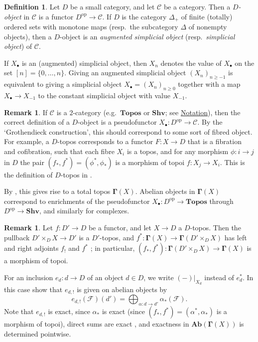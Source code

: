 \documentclass[11pt]{amsart}
\theoremstyle{definition}
\newtheorem{Rmk}[Thm]{Remark}
\newtheorem{Def}[Thm]{Definition}
\newcommand{\op}{^{\operatorname{op}}}
\newcommand{\Ab}{\mathbf{Ab}}
\newcommand{\Topos}{\mathbf{Topos}}
\newcommand{\SHV}{\mathbf{Shv}}
\begin{document}
\begin{Def}
Let $D$ be a small category, and let $\mathscr C$ be a category.
Then a \emph{$D$-object} in $\mathscr C$ is a functor $D\op \to
\mathscr C$. If $D$ is the category $\Delta_+$ of finite (totally)
ordered sets with monotone maps (resp.\ the subcategory $\Delta$ of
nonempty objects), then a $D$-object is an \emph{augmented
simplicial object} (resp.\ \emph{simplicial object}) of $\mathscr
C$.

If $X_\bullet$ is an (augmented) simplicial object, then $X_n$
denotes the value of $X_\bullet$ on the set $[n] = \{0,\ldots,n\}$.
Giving an augmented simplicial object $(X_n)_{n \geq -1}$ is
equivalent to giving a simplicial object $X_\bullet = (X_n)_{n \geq
0}$ together with a map $X_\bullet \to X_{-1}$ to the constant
simplicial object with value $X_{-1}$.
\end{Def}

\begin{Rmk}\label{Rmk simplicial topos}
If $\mathscr C$ is a $2$-category (e.g.~$\Topos$ or $\SHV$; see
\hyperref[Sec Notation]{Notation}), then the correct definition of a
$D$-object is a pseudofunctor $X_\bullet \colon D\op \to \mathscr
C$. By the `Grothendieck construction', this should correspond to
some sort of fibred object. For example, a $D$-topos corresponds to
a functor $F \colon X \to D$ that is a fibration and cofibration,
such that each fibre $X_i$ is a topos, and for any morphism $\phi
\colon i \to j$ in $D$ the pair $(f_*,f^*) = (\phi^*,\phi_*)$ is a
morphism of topoi $f \colon X_j \to X_i$. This is the definition of
$D$-topos in \cite[exp.~V$^{\text{bis}}$,~d\'ef.~1.2.1]{SGA4II}.

By
\cite[exp.~V$^{\text{bis}}$,~d\'ef.~1.2.8~and~prop.~1.2.12]{SGA4II},
this gives rise to a total topos $\mathbf \Gamma(X)$. Abelian
objects in $\mathbf \Gamma(X)$ correspond to enrichments of the
pseudofunctor $X_\bullet \colon D\op \to \Topos$ through $D\op \to
\SHV$, and similarly for complexes.
\end{Rmk}

\begin{Rmk}\label{Rmk change of index}
Let $f \colon D' \to D$ be a functor, and let $X \to D$ a $D$-topos.
Then the pullback $D' \times_D X \to D'$ is a $D'$-topos, and $f^*
\colon \mathbf \Gamma(X) \to \mathbf \Gamma(D' \times_D X)$ has left
and right adjoints $f_!$ and $f^*$ \cite[exp.~V$^{\text{bis}}$,\
prop.~1.2.9]{SGA4II}; in particular, $(f_*,f^*) \colon \mathbf
\Gamma(D' \times_D X) \to \mathbf \Gamma(X)$ is a morphism of topoi.

For an inclusion $e_d \colon d \to D$ of an object $d \in D$, we
write $(-)|_{X_d}$ instead of $e_d^*$. In this case
\cite[exp.~V$^{\text{bis}}$,~cor.~1.2.11~and~prop.~1.3.7]{SGA4II}
show that $e_{d,!}$ is given on abelian objects by
\[
e_{d,!}(\mathscr F)(d') = \bigoplus_{\alpha \colon d \to d'}
\alpha_*(\mathscr F).
\]
Note that $e_{d,!}$ is exact, since $\alpha_*$ is exact (since
$(f_*,f^*) = (\alpha^*,\alpha_*)$ is a morphism of topoi), direct sums are exact
\cite[exp.~II,~prop.~6.7]{SGA4I}, and
exactness in $\Ab(\mathbf \Gamma(X))$ is determined pointwise.
\end{Rmk}
\end{document}
